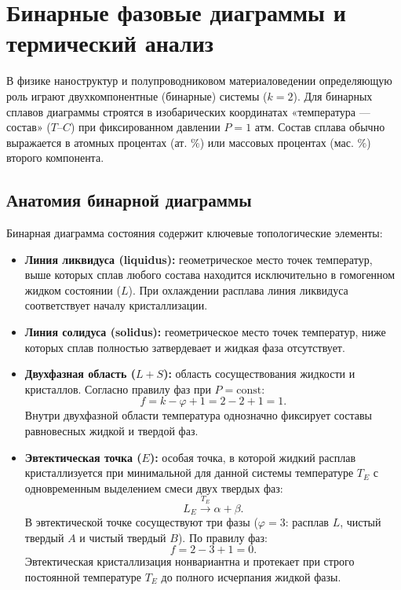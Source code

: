 \documentclass[12pt,a4paper]{article}
\begin{document}
\section{Бинарные фазовые диаграммы и термический анализ}
\label{sec:binary_diagrams}

В физике наноструктур и полупроводниковом материаловедении определяющую роль играют двухкомпонентные (бинарные) системы ($k = 2$). Для бинарных сплавов диаграммы строятся в изобарических координатах «температура --- состав» ($T\text{--}C$) при фиксированном давлении $P = 1\text{ атм}$. Состав сплава обычно выражается в атомных процентах ($\text{ат. } \% $) или массовых процентах ($\text{мас. } \% $) второго компонента.

\subsection{Анатомия бинарной диаграммы}
Бинарная диаграмма состояния содержит ключевые топологические элементы:
\begin{itemize}
    \item \textbf{Линия ликвидуса (liquidus):} геометрическое место точек температур, выше которых сплав любого состава находится исключительно в гомогенном жидком состоянии ($L$). При охлаждении расплава линия ликвидуса соответствует началу кристаллизации.
    \item \textbf{Линия солидуса (solidus):} геометрическое место точек температур, ниже которых сплав полностью затвердевает и жидкая фаза отсутствует.
    \item \textbf{Двухфазная область ($L + S$):} область сосуществования жидкости и кристаллов. Согласно правилу фаз при $P = \mathrm{const}$:
    \begin{equation*}
    f = k - \varphi + 1 = 2 - 2 + 1 = 1.
    \end{equation*}
    Внутри двухфазной области температура однозначно фиксирует составы равновесных жидкой и твердой фаз.
    \item \textbf{Эвтектическая точка ($E$):} особая точка, в которой жидкий расплав кристаллизуется при минимальной для данной системы температуре $T_E$ с одновременным выделением смеси двух твердых фаз:
    \begin{equation}
    L_E \xrightarrow{T_E} \alpha + \beta.
    \label{eq:eutectic_reaction}
    \end{equation}
    В эвтектической точке сосуществуют три фазы ($\varphi = 3$: расплав $L$, чистый твердый $A$ и чистый твердый $B$). По правилу фаз:
    \begin{equation*}
    f = 2 - 3 + 1 = 0.
    \end{equation*}
    Эвтектическая кристаллизация нонвариантна и протекает при строго постоянной температуре $T_E$ до полного исчерпания жидкой фазы.
\end{itemize}
\end{document}
